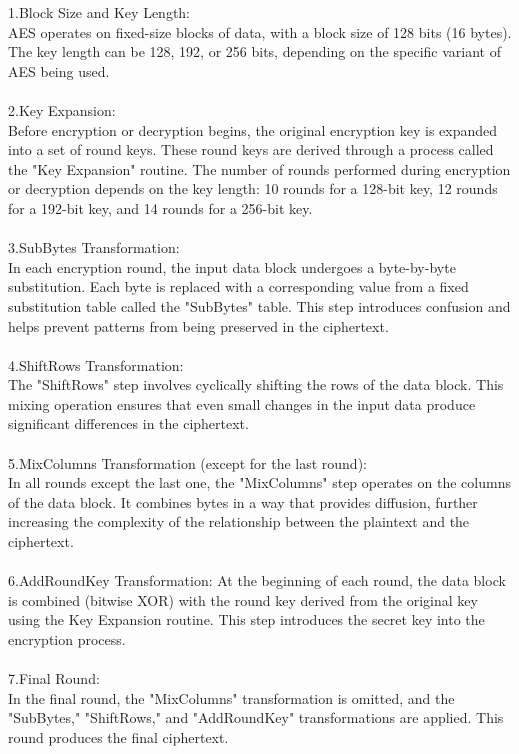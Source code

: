 \documentclass{report}
\begin{document}
1.Block Size and Key Length:\\
AES operates on fixed-size blocks of data, with a block size of 128 bits (16 bytes). The key length can be 128, 192, or 256 bits, depending on the specific variant of AES being used.\\
\\
2.Key Expansion:\\
Before encryption or decryption begins, the original encryption key is expanded into a set of round keys. These round keys are derived through a process called the "Key Expansion" routine. The number of rounds performed during encryption or decryption depends on the key length: 10 rounds for a 128-bit key, 12 rounds for a 192-bit key, and 14 rounds for a 256-bit key.\\
\\
3.SubBytes Transformation:\\
In each encryption round, the input data block undergoes a byte-by-byte substitution. Each byte is replaced with a corresponding value from a fixed substitution table called the "SubBytes" table. This step introduces confusion and helps prevent patterns from being preserved in the ciphertext.\\
\\
4.ShiftRows Transformation:\\
The "ShiftRows" step involves cyclically shifting the rows of the data block. This mixing operation ensures that even small changes in the input data produce significant differences in the ciphertext.\\
\\
5.MixColumns Transformation (except for the last round):\\
In all rounds except the last one, the "MixColumns" step operates on the columns of the data block. It combines bytes in a way that provides diffusion, further increasing the complexity of the relationship between the plaintext and the ciphertext.\\
\\
6.AddRoundKey Transformation:
At the beginning of each round, the data block is combined (bitwise XOR) with the round key derived from the original key using the Key Expansion routine. This step introduces the secret key into the encryption process.\\
\\
7.Final Round:\\
In the final round, the "MixColumns" transformation is omitted, and the "SubBytes," "ShiftRows," and "AddRoundKey" transformations are applied. This round produces the final ciphertext.\\
\end{document}
